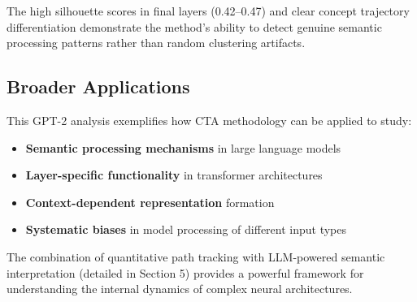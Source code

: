 The high silhouette scores in final layers (0.42--0.47) and clear concept trajectory differentiation demonstrate the method's ability to detect genuine semantic processing patterns rather than random clustering artifacts.

\subsection{Broader Applications}

This GPT-2 analysis exemplifies how CTA methodology can be applied to study:

\begin{itemize}
    \item \textbf{Semantic processing mechanisms} in large language models
    \item \textbf{Layer-specific functionality} in transformer architectures  
    \item \textbf{Context-dependent representation} formation
    \item \textbf{Systematic biases} in model processing of different input types
\end{itemize}

The combination of quantitative path tracking with LLM-powered semantic interpretation (detailed in Section 5) provides a powerful framework for understanding the internal dynamics of complex neural architectures.